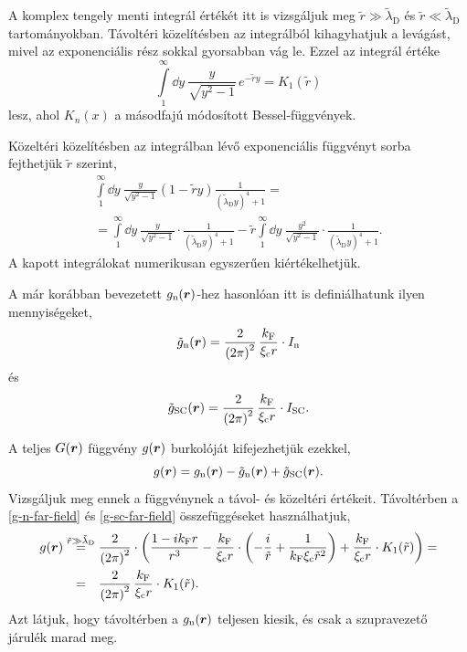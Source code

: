 \documentclass[a4paper,12pt,titlepage]{article}
\newcommand{\RR}{{\vb*{r}}}
\newcommand{\kF}{{k_\text{F}}}
\begin{document}
A komplex tengely menti integrál értékét itt is vizsgáljuk meg $\tilde{r} \gg \tilde{\lambda}_\text{D}$ és $\tilde{r} \ll \tilde{\lambda}_\text{D}$ tartományokban.  Távoltéri közelítésben az integrálból kihagyhatjuk a levágást, mivel az exponenciális rész sokkal gyorsabban vág le. Ezzel az integrál értéke
\begin{equation} \label{g-sc-far-field}
	\int\limits_1^\infty \dd{y} ~ \frac{y}{\sqrt{y^2 - 1}} \, e^{-\tilde{r} y} = K_1(\tilde{r})
\end{equation}
lesz, ahol $K_n(x)$ a másodfajú módosított Bessel-függvények.

Közeltéri közelítésben az integrálban lévő exponenciális függvényt sorba fejthetjük $\tilde{r}$ szerint,
\begin{multline} \label{g-sc-near-field}
	\int\limits_1^\infty \dd{y} ~ \frac{y}{\sqrt{y^2 - 1}} \left( 1 - \tilde{r} y \right) \frac{1}{\left( \tilde{\lambda}_\text{D} y \right)^4 + 1} = \\
	= \int\limits_1^\infty \dd{y} ~ \frac{y}{\sqrt{y^2 - 1}} \cdot \frac{1}{\left( \tilde{\lambda}_\text{D} y \right)^4 + 1} - \tilde{r} \int\limits_1^\infty \dd{y} ~ \frac{y^2}{\sqrt{y^2 - 1}} \cdot \frac{1}{\left( \tilde{\lambda}_\text{D} y \right)^4 + 1}.
\end{multline}
A kapott integrálokat numerikusan egyszerűen kiértékelhetjük.

A már korábban bevezetett $g_\text{n}(\RR)$-hez hasonlóan itt is definiálhatunk ilyen mennyiségeket,
\begin{equation}
	\tilde{g}_\text{n}(\RR) = \frac{2}{\left( 2 \pi \right)^2} \, \frac{\kF}{\xi_\text{c} r} \cdot I_\text{n}
\end{equation}
és
\begin{equation}
	\tilde{g}_\text{SC}(\RR) = \frac{2}{\left( 2 \pi \right)^2} \, \frac{\kF}{\xi_\text{c} r} \cdot I_\text{SC}.
\end{equation}

A teljes $G(\RR)$ függvény $g(\RR)$ burkolóját kifejezhetjük ezekkel,
\begin{equation}
	g(\RR) = g_\text{n}(\RR) - \tilde{g}_\text{n}(\RR) + \tilde{g}_\text{SC}(\RR).
\end{equation}
Vizsgáljuk meg ennek a függvénynek a távol- és közeltéri értékeit.  Távoltérben a \eqref{g-n-far-field} és \eqref{g-sc-far-field} összefüggéseket használhatjuk,
\begin{equation}
\begin{split}
	g(\RR) & \stackrel{\tilde{r} \gg \tilde{\lambda}_\text{D}}{=} \frac{2}{\left( 2 \pi \right)^2} \cdot \left( \frac{1 - i \kF r}{r^3} - \frac{\kF}{\xi_\text{c} r} \cdot \left( -\frac{i}{\tilde{r}} + \frac{1}{\kF \xi_\text{c} \tilde{r}^2} \right) + \frac{\kF}{\xi_\text{c} r} \cdot K_1(\tilde{r}) \right) = \\
	& \stackrel{\phantom{\tilde{r} \gg \tilde{\lambda}_\text{D}}}{=} \frac{2}{\left( 2 \pi \right)^2} \, \frac{\kF}{\xi_\text{c} r} \cdot K_1(\tilde{r}).
\end{split}
\end{equation}
Azt látjuk, hogy távoltérben a $g_\text{n}(\RR)$ teljesen kiesik, és csak a szupravezető járulék marad meg.
\end{document}
